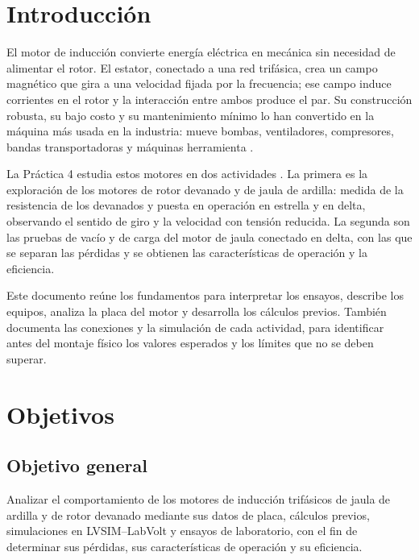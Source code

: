 \documentclass[conference]{IEEEtran}
\begin{document}
\section{Introducción}
El motor de inducción convierte energía eléctrica en mecánica sin necesidad de alimentar el rotor. El estator, conectado a una red trifásica, crea un campo magnético que gira a una velocidad fijada por la frecuencia; ese campo induce corrientes en el rotor y la interacción entre ambos produce el par. Su construcción robusta, su bajo costo y su mantenimiento mínimo lo han convertido en la máquina más usada en la industria: mueve bombas, ventiladores, compresores, bandas transportadoras y máquinas herramienta \cite{chapman,fraile}.

La Práctica 4 estudia estos motores en dos actividades \cite{guia}. La primera es la exploración de los motores de rotor devanado y de jaula de ardilla: medida de la resistencia de los devanados y puesta en operación en estrella y en delta, observando el sentido de giro y la velocidad con tensión reducida. La segunda son las pruebas de vacío y de carga del motor de jaula conectado en delta, con las que se separan las pérdidas y se obtienen las características de operación y la eficiencia.

Este documento reúne los fundamentos para interpretar los ensayos, describe los equipos, analiza la placa del motor y desarrolla los cálculos previos. También documenta las conexiones y la simulación de cada actividad, para identificar antes del montaje físico los valores esperados y los límites que no se deben superar.

\section{Objetivos}
\subsection{Objetivo general}
Analizar el comportamiento de los motores de inducción trifásicos de jaula de ardilla y de rotor devanado mediante sus datos de placa, cálculos previos, simulaciones en LVSIM--LabVolt y ensayos de laboratorio, con el fin de determinar sus pérdidas, sus características de operación y su eficiencia.
\end{document}
